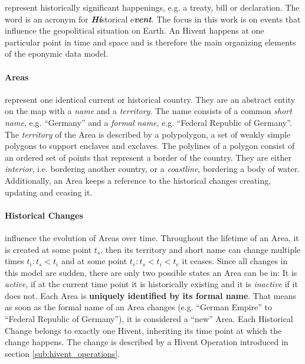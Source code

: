 represent historically significant happenings, e.g. a treaty, bill or declaration.
The word is an acronym for \emph{\textbf{Hi}}storical e\emph{\textbf{vent}}.
The focus in this work is on events that influence the geopolitical situation on Earth.
An Hivent happens at one particular point in time and space and is therefore the main organizing elements of the eponymic data model.


\vspace{-1em}
\paragraph{Areas} %
\label{par:area}

represent one identical current or historical country. They are an abstract entity on the map with a \emph{name} and a \emph{territory}. The name consists of a common \emph{short name}, e.g. ``Germany'' and a \emph{formal name}, e.g. ``Federal Republic of Germany''. The \emph{territory} of the Area is described by a polypolygon, a set of weakly simple polygons to support enclaves and exclaves. The polylines of a polygon consist of an ordered set of points that represent a border of the country. They are either \emph{interior}, i.e. bordering another country, or a \emph{coastline}, bordering a body of water. Additionally, an Area keeps a reference to the historical changes creating, updating and ceasing it.


\vspace{-1em}
\paragraph{Historical Changes} %
\label{par:historical_changes}

influence the evolution of Areas over time. Throughout the lifetime of an Area, it is created at some point $t_s$, then its territory and short name can change multiple times $t_i: t_s < t_i$ and at some point $t_e: t_s < t_i < t_e$ it ceases. Since all changes in this model are sudden, there are only two possible states an Area can be in: It is \emph{active}, if at the current time point it is historically existing and it is \emph{inactive} if it does not. Each Area is \textbf{uniquely identified by its formal name}. That means as soon as the formal name of an Area changes (e.g. ``German Empire'' to ``Federal Republic of Germany''), it is considered a ``new'' Area. Each Historical Change belongs to exactly one Hivent, inheriting its time point at which the change happens.  The change is described by a Hivent Operation introduced in section \ref{sub:hivent_operations}.


